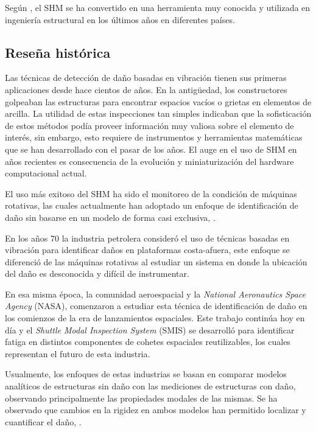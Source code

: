 Según \citet{enckell2006structural}, el SHM se ha convertido en una herramienta muy conocida y utilizada en ingeniería estructural en los últimos años en diferentes países.

\subsection{Reseña histórica}

Las técnicas de detección de daño basadas en vibración tienen sus primeras aplicaciones desde hace cientos de años. En la antigüedad, los constructores golpeaban las estructuras para encontrar espacios vacíos o grietas en elementos de arcilla. La utilidad de estas inspecciones tan simples indicaban que la sofisticación de estos métodos podía proveer información muy valiosa sobre el elemento de interés, sin embargo, esto requiere de instrumentos y herramientas matemáticas que se han desarrollado con el pasar de los años. El auge en el uso de SHM en años recientes es consecuencia de la evolución y miniaturización del hardware computacional actual.


El uso más exitoso del SHM ha sido el monitoreo de la condición de máquinas rotativas, las cuales actualmente han adoptado un enfoque de identificación de daño sin basarse en un modelo de forma casi exclusiva, \citep{farrar2007introduction}.

En los años 70 la industria petrolera consideró el uso de técnicas basadas en vibración para identificar daños en plataformas costa-afuera, este enfoque se diferenció de las máquinas rotativas al estudiar un sistema en donde la ubicación del daño es desconocida y difícil de instrumentar.

En esa misma época, la comunidad aeroespacial y la \textit{National Aeronautics Space Agency} (NASA), comenzaron a estudiar esta técnica de identificación de daño en los comienzos de la era de lanzamientos espaciales. Este trabajo continúa hoy en día y el \textit{Shuttle Modal Inspection System} (SMIS) se desarrolló para identificar fatiga en distintos componentes de cohetes espaciales reutilizables, los cuales representan el futuro de esta industria.


Usualmente, los enfoques de estas industrias se basan en comparar modelos analíticos de estructuras sin daño con las mediciones de estructuras con daño, observando principalmente las propiedades modales de las mismas. Se ha observado que cambios en la rigidez en ambos modelos han permitido localizar y cuantificar el daño, \citep{farrar2007introduction}.

